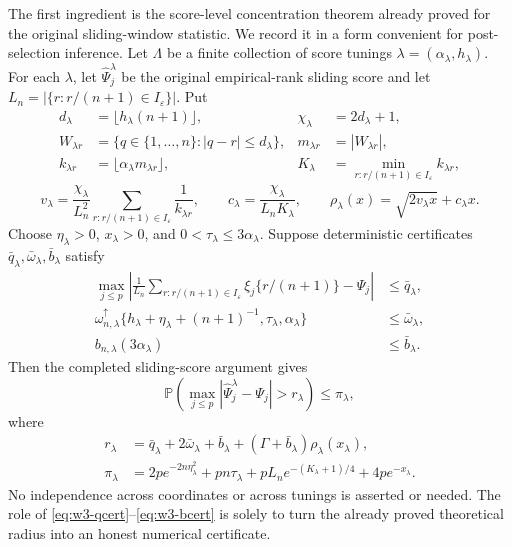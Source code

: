 \documentclass[11pt]{article}
\theoremstyle{remark}
\newcommand{\Pp}{\mathbb P}
\newcommand{\I}{I_\varepsilon}
\begin{document}
The first ingredient is the score-level concentration theorem already proved
for the original sliding-window statistic.  We record it in a form convenient
for post-selection inference.  Let $\Lambda$ be a finite collection of score
tunings $\lambda=(\alpha_\lambda,h_\lambda)$.  For each $\lambda$, let
$\widehat\Psi_j^\lambda$ be the original empirical-rank sliding score and let
$L_n=|\{r:r/(n+1)\in\I\}|$.  Put
\begin{align}
 d_\lambda&=\lfloor h_\lambda(n+1)\rfloor,
 &\chi_\lambda&=2d_\lambda+1,\nonumber\\
 W_{\lambda r}&=\{q\in\{1,\ldots,n\}:|q-r|\le d_\lambda\},
 &m_{\lambda r}&=|W_{\lambda r}|,\nonumber\\
 k_{\lambda r}&=\lfloor\alpha_\lambda m_{\lambda r}\rfloor,
 &K_\lambda&=\min_{r:r/(n+1)\in\I}k_{\lambda r},
 \label{eq:w3-rank-geometry}
\end{align}
\begin{equation}
 v_\lambda=\frac{\chi_\lambda}{L_n^2}
 \sum_{r:r/(n+1)\in\I}\frac1{k_{\lambda r}},
 \qquad
 c_\lambda=\frac{\chi_\lambda}{L_nK_\lambda},
 \qquad
 \rho_\lambda(x)=\sqrt{2v_\lambda x}+c_\lambda x.
 \label{eq:w3-rho}
\end{equation}
Choose $\eta_\lambda>0$, $x_\lambda>0$, and
$0<\tau_\lambda\le3\alpha_\lambda$.  Suppose deterministic certificates
$\bar q_\lambda,\bar\omega_\lambda,\bar b_\lambda$ satisfy
\begin{align}
 \max_{j\le p}\left|
 \frac1{L_n}\sum_{r:r/(n+1)\in\I}\xi_j\{r/(n+1)\}-\Psi_j
 \right|&\le\bar q_\lambda,
 \label{eq:w3-qcert}\\
 \omega_{n,\lambda}^{\uparrow}
 \{h_\lambda+\eta_\lambda+(n+1)^{-1},
       \tau_\lambda,\alpha_\lambda\}&\le\bar\omega_\lambda,
 \label{eq:w3-omegacert}\\
 b_{n,\lambda}(3\alpha_\lambda)&\le\bar b_\lambda.
 \label{eq:w3-bcert}
\end{align}
Then the completed sliding-score argument gives
\begin{equation}
 \Pp\left(
 \max_{j\le p}|\widehat\Psi_j^\lambda-\Psi_j|>r_\lambda
 \right)\le\pi_\lambda,
 \label{eq:w3-score-band}
\end{equation}
where
\begin{align}
 r_\lambda
 &=\bar q_\lambda+2\bar\omega_\lambda+\bar b_\lambda
   +(\Gamma+\bar b_\lambda)\rho_\lambda(x_\lambda),
 \label{eq:w3-rscore}\\
 \pi_\lambda
 &=2p e^{-2n\eta_\lambda^2}+pn\tau_\lambda
   +pL_ne^{-(K_\lambda+1)/4}+4pe^{-x_\lambda}.
 \label{eq:w3-piscore}
\end{align}
No independence across coordinates or across tunings is asserted or needed.
The role of \eqref{eq:w3-qcert}--\eqref{eq:w3-bcert} is solely to turn the
already proved theoretical radius into an honest numerical certificate.
\end{document}
